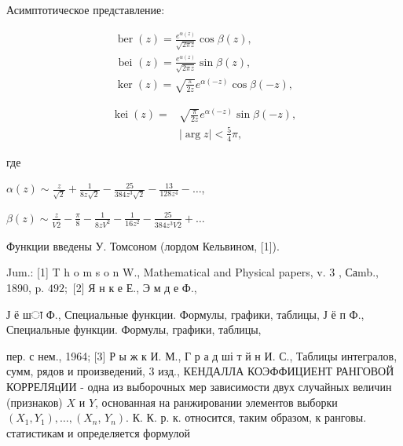 \documentclass[10pt]{article}
\begin{document}
Асимптотическое представление:



\[

\begin{gathered}

\operatorname{ber}(z)=\frac{e^{\alpha(z)}}{\sqrt{2 \pi z}} \cos \beta(z), \\

\text { bei }(z)=\frac{e^{\alpha(z)}}{\sqrt{2 \pi z}} \sin \beta(z), \\

\operatorname{ker}(z)=\sqrt{\frac{\pi}{2 z}} e^{\alpha(-z)} \cos \beta(-z),

\end{gathered}

\]



\[

\begin{aligned}

\operatorname{kei}(z)= & \sqrt{\frac{\pi}{2 z}} e^{\alpha(-z)} \sin \beta(-z), \\

& |\arg z|<\frac{5}{4} \pi,

\end{aligned}

\]



где



$\alpha(z) \sim \frac{z}{\sqrt{2}}+\frac{1}{8 z \sqrt{2}}-\frac{25}{384 z^{3} \sqrt{2}}-\frac{13}{128 z^{4}}-\ldots$,



$\beta(z) \sim \frac{z}{V \overline{2}}-\frac{\pi}{8}-\frac{1}{8 z V^{2}}-\frac{1}{16 z^{2}}-\frac{25}{384 z^{3} V \overline{2}}+\ldots$



Функции введены У. Томсоном (лордом Кельвином, [1]).



Jum.: [1] T h o m s o n W., Mathematical and Physical papers, v. 3 , Саmb., 1890, p. $492 ;$ [2] Я н к е Е., Э м д е Ф.,

Ј ё шा Ф., Специальные функции. Формулы, графики, таблицы, Ј ё п Ф., Специальные функции. Формулы, графики, таблицы,

пер. с нем., 1964; [3] Р ы ж к И. М., Г р а д ші т й н И. С., Таблицы интегралов, сумм, рядов и произведений, 3 изд., КЕНДАЛЛА КОЭФФИЦИЕНТ РАНГОВОЙ КОРРЕЛЯцИИ - одна из выборочных мер зависимости двух случайных величин (признаков) $X$ и $Y$, основанная на ранжировании элементов выборки $\left(X_{1}, Y_{1}\right), \ldots,\left(X_{n}\right.$, $\left.Y_{n}\right)$. К. К. р. к. относится, таким образом, к ранговы. статистикам и определяется формулой
\end{document}
